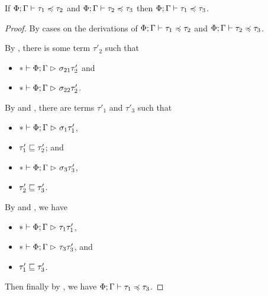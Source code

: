 \begin{theorem} \label{thm:transivity-subtyping}
If $\Phi; \Gamma \mathrel{\vdash} \tau_1 \mathrel{\preccurlyeq} \tau_2$ and $\Phi; \Gamma \mathrel{\vdash} \tau_2 \mathrel{\preccurlyeq} \tau_3$
then $\Phi; \Gamma \mathrel{\vdash} \tau_1 \mathrel{\preccurlyeq} \tau_3$.
\end{theorem}

\begin{proof}
By cases on the derivations of $\Phi; \Gamma \mathrel{\vdash} \tau_1 \mathrel{\preccurlyeq} \tau_2$
and $\Phi; \Gamma \mathrel{\vdash} \tau_2 \mathrel{\preccurlyeq} \tau_3$.
By , there is some term $\tau'_2$ such that
\begin{itemize}[noitemsep]
  \item $* \mathrel{\vdash} \Phi; \Gamma \mathrel{\rhd}_{} \sigma_{21}{\tau'_2}$ and
  \item $* \mathrel{\vdash} \Phi; \Gamma \mathrel{\rhd}_{} \sigma_{22}{\tau'_2}$.
\end{itemize}
By  and ,
there are terms $\tau'_1$ and $\tau'_3$ such that
\begin{itemize}[noitemsep]
  \item $* \mathrel{\vdash} \Phi; \Gamma \mathrel{\rhd}_{} \sigma_1{\tau'_1}$,
  \item $\tau'_1 \mathrel{\sqsubseteq} \tau'_2$; and
  \item $* \mathrel{\vdash} \Phi; \Gamma \mathrel{\rhd}_{} \sigma_3{\tau'_3}$,
  \item $\tau'_2 \mathrel{\sqsubseteq} \tau'_3$.
\end{itemize}
By  and , we have
\begin{itemize}[noitemsep]
  \item $* \mathrel{\vdash} \Phi; \Gamma \mathrel{\rhd}_{} \tau_1{\tau'_1}$,
  \item $* \mathrel{\vdash} \Phi; \Gamma \mathrel{\rhd}_{} \tau_3{\tau'_3}$, and
  \item $\tau'_1 \mathrel{\sqsubseteq} \tau'_3$.
\end{itemize}
Then finally by , we have $\Phi; \Gamma \mathrel{\vdash} \tau_1 \mathrel{\preccurlyeq} \tau_3$.
\end{proof}

